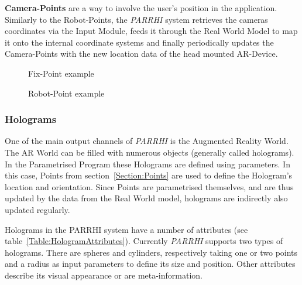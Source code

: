 \textbf{Camera-Points} are a way to involve the user's position in the application. Similarly to the Robot-Points, the \textit{PARRHI} system retrieves the cameras coordinates via the Input Module, feeds it through the Real World Model to map it onto the internal coordinate systems and finally periodically updates the Camera-Points with the new location data of the head mounted AR-Device.


\begin{figure}[h!]
	\begin{minipage}{0.45\textwidth}
		\centering
		
		\caption{Fix-Point example}
		\label{InputData:PointFix}
	\end{minipage}\hfill
	\begin{minipage}{0.45\textwidth}
		\centering
		
		\caption{Robot-Point example}
		\label{InputData:PointRobot}
	\end{minipage}
\end{figure}


\subsubsection{Holograms}\label{Section:Holograms}
One of the main output channels of \textit{PARRHI} is the Augmented Reality World. The AR World can be filled with numerous objects (generally called holograms). In the Parametrised Program these Holograms are defined using parameters. In this case, Points from section~\ref{Section:Points} are used to define the Hologram's location and orientation. Since Points are parametrised themselves, and are thus updated by the data from the Real World model, holograms are indirectly also updated regularly.

Holograms in the PARRHI system have a number of attributes (see table~\ref{Table:HologramAttributes}). Currently \textit{PARRHI} supports two types of holograms. There are spheres and cylinders, respectively taking one or two points and a radius as input parameters to define its size and position. Other attributes describe its visual appearance or are meta-information.

